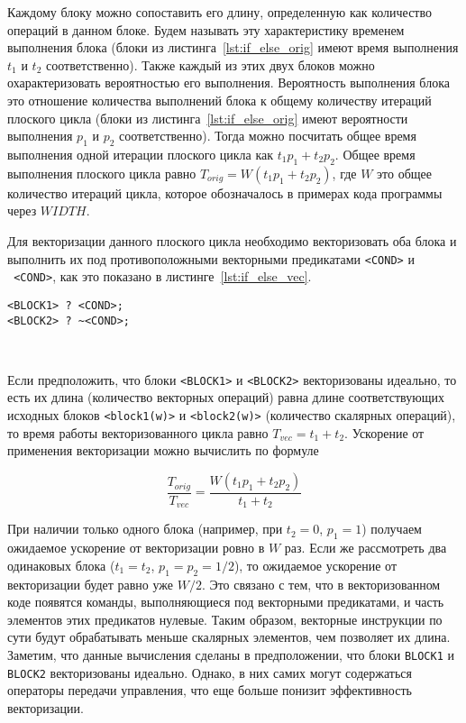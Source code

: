 \documentclass[
11pt,%
tightenlines,%
twoside,%
onecolumn,%
nofloats,%
nobibnotes,%
nofootinbib,%
superscriptaddress,%
noshowpacs,%
centertags]%
{revtex4}
\begin{document}
Каждому блоку можно сопоставить его длину, определенную как количество операций в данном блоке.
Будем называть эту характеристику временем выполнения блока (блоки из листинга~\ref{lst:if_else_orig} имеют время выполнения $t_1$ и $t_2$ соответственно).
Также каждый из этих двух блоков можно охарактеризовать вероятностью его выполнения.
Вероятность выполнения блока это отношение количества выполнений блока к общему количеству итераций плоского цикла (блоки из листинга~\ref{lst:if_else_orig} имеют вероятности выполнения $p_1$ и $p_2$ соответственно).
Тогда можно посчитать общее время выполнения одной итерации плоского цикла как $t_1 p_1 + t_2 p_2$.
Общее время выполнения плоского цикла равно $T_{orig} = W(t_1 p_1 + t_2 p_2)$, где $W$ это общее количество итераций цикла, которое обозначалось в примерах кода программы через $WIDTH$.

Для векторизации данного плоского цикла необходимо векторизовать оба блока и выполнить их под противоположными векторными предикатами \texttt{<COND>} и \texttt{~<COND>}, как это показано в листинге~\ref{lst:if_else_vec}.

\begin{lstlisting}[caption={Векторизованная конструкция \texttt{if-else}.},label={lst:if_else_vec}]
<BLOCK1> ? <COND>;
<BLOCK2> ? ~<COND>;
\end{lstlisting}

\

Если предположить, что блоки \texttt{<BLOCK1>} и \texttt{<BLOCK2>} векторизованы идеально, то есть их длина (количество векторных операций) равна длине соответствующих исходных блоков \texttt{<block1(w)>} и \texttt{<block2(w)>} (количество скалярных операций), то время работы векторизованного цикла равно $T_{vec} = t_1 + t_2$.
Ускорение от применения векторизации можно вычислить по формуле

\begin{equation}
\frac{T_{orig}}{T_{vec}} = \frac{W(t_1 p_1 + t_2 p_2)}{t_1 + t_2}
\end{equation}

При наличии только одного блока (например, при $t_2 = 0$, $p_1 = 1$) получаем ожидаемое ускорение от векторизации ровно в $W$ раз.
Если же рассмотреть два одинаковых блока ($t_1 = t_2$, $p_1 = p_2 = 1/2$), то ожидаемое ускорение от векторизации будет равно уже $W/2$.
Это связано с тем, что в векторизованном коде появятся команды, выполняющиеся под векторными предикатами, и часть элементов этих предикатов нулевые.
Таким образом, векторные инструкции по сути будут обрабатывать меньше скалярных элементов, чем позволяет их длина.
Заметим, что данные вычисления сделаны в предположении, что блоки \texttt{BLOCK1} и \texttt{BLOCK2} векторизованы идеально.
Однако, в них самих могут содержаться операторы передачи управления, что еще больше понизит эффективность векторизации.
\end{document}
